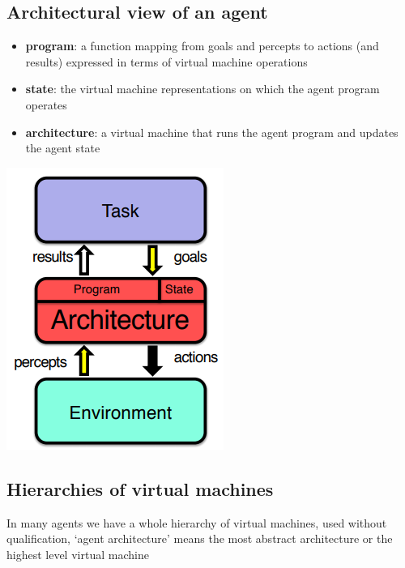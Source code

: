 \documentclass{article}
\begin{document}
\pagebreak

\subsection{Architectural view of an agent} 

\begin{multicols}{2}

\begin{itemize}
  \item \textbf{program}: a function mapping from goals and percepts to actions (and results) expressed in terms of virtual machine operations 
  \item \textbf{state}: the virtual machine representations on which the agent program operates 
  \item \textbf{architecture}: a virtual machine that runs the agent program and updates the agent state
\end{itemize}

\includegraphics[scale=0.5]{architectural_agent_view.png}

\end{multicols}

\subsection{Hierarchies of virtual machines}

\begin{flushleft}
In many agents we have a whole hierarchy of virtual machines, used without qualification, ‘agent architecture’ means the most abstract architecture or the highest level virtual machine
\end{flushleft}
\end{document}

